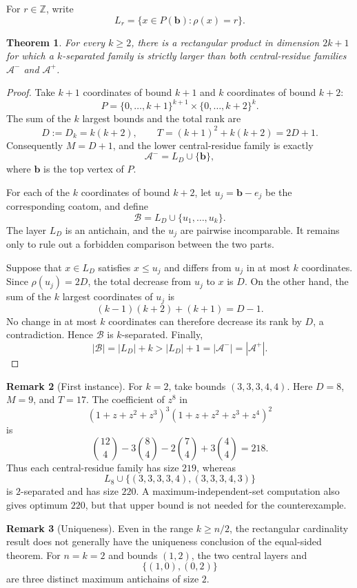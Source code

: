 \documentclass[11pt]{article}
\newtheorem{theorem}{Theorem}
\theoremstyle{definition}
\newtheorem{remark}[theorem]{Remark}
\newcommand{\rank}{\rho}
\newcommand{\layer}[1]{L_{#1}}
\begin{document}
For $r\in\mathbb Z$, write
\[
  \layer r=\{x\in P(\mathbf b):\rank(x)=r\}.
\]

\begin{theorem}
For every $k\geq2$, there is a rectangular product in dimension $2k+1$
for which a $k$-separated family is strictly larger than both central-residue
families $\mathcal A^-$ and $\mathcal A^+$.
\end{theorem}

\begin{proof}
Take $k+1$ coordinates of bound $k+1$ and $k$ coordinates of bound $k+2$:
\[
  P=\{0,\ldots,k+1\}^{k+1}\times
    \{0,\ldots,k+2\}^{k}.
\]
The sum of the $k$ largest bounds and the total rank are
\[
  D:=D_k=k(k+2),\qquad
  T=(k+1)^2+k(k+2)=2D+1.
\]
Consequently $M=D+1$, and the lower central-residue family is exactly
\[
  \mathcal A^-=\layer D\cup\{\mathbf b\},
\]
where $\mathbf b$ is the top vertex of $P$.

For each of the $k$ coordinates of bound $k+2$, let
$u_j=\mathbf b-e_j$ be the corresponding coatom, and define
\[
  \mathcal B=\layer D\cup\{u_1,\ldots,u_k\}.
\]
The layer $\layer D$ is an antichain, and the $u_j$ are pairwise
incomparable.  It remains only to rule out a forbidden comparison between
the two parts.

Suppose that $x\in\layer D$ satisfies $x\leq u_j$ and differs from $u_j$
in at most $k$ coordinates.  Since
$\rank(u_j)=2D$, the total decrease from $u_j$ to $x$ is $D$.  On the other
hand, the sum of the $k$ largest coordinates of $u_j$ is
\[
  (k-1)(k+2)+(k+1)=D-1.
\]
No change in at most $k$ coordinates can therefore decrease its rank by
$D$, a contradiction.  Hence $\mathcal B$ is $k$-separated.  Finally,
\[
  |\mathcal B|=|\layer D|+k
  >|\layer D|+1=|\mathcal A^-|=|\mathcal A^+|.
\]
\end{proof}

\begin{remark}[First instance]
For $k=2$, take bounds $(3,3,3,4,4)$.  Here $D=8$, $M=9$, and $T=17$.
The coefficient of $z^8$ in
\[
  (1+z+z^2+z^3)^3(1+z+z^2+z^3+z^4)^2
\]
is
\[
  \binom{12}{4}-3\binom84-2\binom74+3\binom44=218.
\]
Thus each central-residue family has size $219$, whereas
\[
  \layer8\cup\{(3,3,3,3,4),(3,3,3,4,3)\}
\]
is $2$-separated and has size $220$.  A maximum-independent-set computation
also gives optimum $220$, but that upper bound is not needed for the
counterexample.
\end{remark}

\begin{remark}[Uniqueness]
Even in the range $k\geq n/2$, the rectangular cardinality result does not
generally have the uniqueness conclusion of the equal-sided theorem.  For
$n=k=2$ and bounds $(1,2)$, the two central layers and
\[
  \{(1,0),(0,2)\}
\]
are three distinct maximum antichains of size $2$.
\end{remark}
\end{document}
